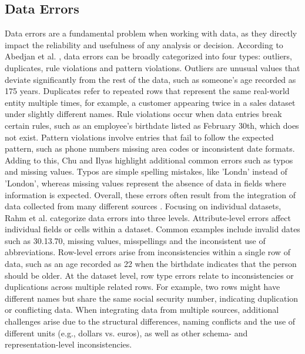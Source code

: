 \subsection{Data Errors}
Data errors are a fundamental problem when working with data, as they directly impact the reliability and usefulness of any analysis or decision. 
According to Abedjan et al. \cite{DDE}, data errors can be broadly categorized into four types: outliers, duplicates, rule violations and pattern violations. 
Outliers are unusual values that deviate significantly from the rest of the data, such as someone's age recorded as 175 years. 
Duplicates refer to repeated rows that represent the same real-world entity multiple times, for example, a customer appearing twice in a sales dataset under slightly different names. 
Rule violations occur when data entries break certain rules, such as an employee's birthdate listed as February 30th, which does not exist. 
Pattern violations involve entries that fail to follow the expected pattern, such as phone numbers missing area codes or inconsistent date formats. 
Adding to this, Chu and Ilyas \cite{QDC} highlight additional common errors such as typos and missing values. 
Typos are simple spelling mistakes, like 'Londn' instead of 'London', whereas missing values represent the absence of data in fields where information is expected. 
Overall, these errors often result from the integration of data collected from many different sources \cite{DDPCA}.
\newline\newline  
Focusing on individual datasets, Rahm et al. \cite{DDPCA} categorize data errors into three levels. 
Attribute-level errors affect individual fields or cells within a dataset. 
Common examples include invalid dates such as 30.13.70, missing values, misspellings and the inconsistent use of abbreviations. 
Row-level errors arise from inconsistencies within a single row of data, such as an age recorded as 22 when the birthdate indicates that the person should be older. 
At the dataset level, row type errors relate to inconsistencies or duplications across multiple related rows. For example, two rows might have different names but share the same social security number, indicating duplication or conflicting data. 
When integrating data from multiple sources, additional challenges arise due to the structural differences, naming conflicts and the use of different units (e.g., dollars vs. euros), as well as other schema- and representation-level inconsistencies.
\newline\newline
